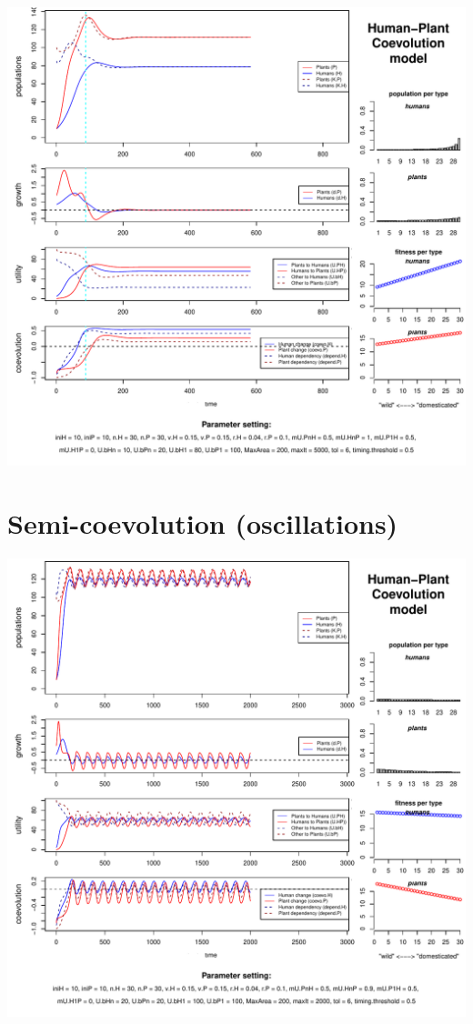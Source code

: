 \documentclass[
]{book}
\begin{document}
\includegraphics{hpcModel-exploration_files/figure-latex/1_run.semicoevo-plot-1.pdf}

\newpage

\hypertarget{semi-coevolution-oscillations}{%
\section{Semi-coevolution (oscillations)}\label{semi-coevolution-oscillations}}

\includegraphics{hpcModel-exploration_files/figure-latex/1_run.semicoevo.osc1-plot-1.pdf}
\end{document}
